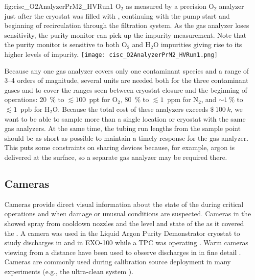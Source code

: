 \begin{dunefigure}{fig:cisc_O2AnalyzerPrM2_HVRun1}
  {$\text{O}_2$ as measured by a precision $\text{O}_2$ analyzer just after the  cryostat was filled with \lar, continuing with the \lar pump start and beginning of \lar recirculation through the filtration system. As the gas analyzer loses sensitivity, the purity monitor can pick up the impurity measurement. Note that the purity monitor is sensitive to both $\text{O}_2$ and $\text{H}_2\text{O}$ impurities giving rise to its higher levels of impurity.}
  \texttt{[image: cisc\_O2AnalyzerPrM2\_HVRun1.png]}
\end{dunefigure}

Because any one gas analyzer covers only one contaminant species and a range of \numrange{3}{4} orders of magnitude, several units are needed both for the three contaminant gases and to cover the ranges seen between  cryostat closure and the beginning of  operations:
\SI{20}{\percent} to $\lesssim 100$~ppt for $\text{O}_2$,
\SI{80}{\percent} to $\lesssim 1$~ppm for $\text{N}_2$, and
$\sim \SI{1}{\percent}$ to $\lesssim 1$~ppb for $\text{H}_2\text{O}$.
Because the total cost of these analyzers exceeds $\SI{100}[\mathdollar]{k}$, we want to be able to  sample more than a single location or cryostat with the same gas analyzers. At the same time, the tubing run lengths from the sample point should be as short as possible to maintain a timely response for the gas analyzer. This puts some constraints on sharing devices because, for example, argon is delivered at the surface, so a separate gas analyzer may be required there. %


\subsection{Cameras}

Cameras provide direct visual information about the state of the
 during critical operations and when damage or unusual
conditions are suspected.  Cameras in the  showed spray from cooldown
nozzles and the level and state of the \lar as it covered the  \cite{Murphy:20170516}.  A camera was
used in the Liquid Argon Purity Demonstrator
cryostat\cite{Adamowski:2014daa} to study  discharges in
\lar and in EXO-100 while a TPC was operating
\cite{Delaquis:2013hva}.  Warm cameras viewing \lar from a distance
have been used to observe  discharges in \lar in
fine detail \cite{Auger:2015xlo}.  Cameras are commonly used during
calibration source deployment in many experiments (e.g., the
\kamland ultra-clean system \cite{Banks:2014hra}).

